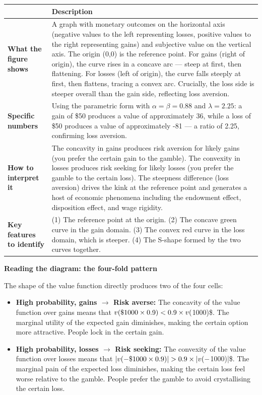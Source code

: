 \documentclass[12pt, letterpaper]{article}
\begin{document}
\begin{table}[H]
\centering
\small
\begin{tabularx}{\linewidth}{lY}
\toprule
 & Description \\
\midrule
\textbf{What the figure shows} & A graph with monetary outcomes on the horizontal axis (negative values to the left representing losses, positive values to the right representing gains) and subjective value on the vertical axis. The origin (0,0) is the reference point. For gains (right of origin), the curve rises in a concave arc --- steep at first, then flattening. For losses (left of origin), the curve falls steeply at first, then flattens, tracing a convex arc. Crucially, the loss side is steeper overall than the gain side, reflecting loss aversion. \\
\textbf{Specific numbers} & Using the parametric form with $\alpha = \beta = 0.88$ and $\lambda = 2.25$: a gain of \$50 produces a value of approximately 36, while a loss of \$50 produces a value of approximately -81 --- a ratio of 2.25, confirming loss aversion. \\
\textbf{How to interpret it} & The concavity in gains produces risk aversion for likely gains (you prefer the certain gain to the gamble). The convexity in losses produces risk seeking for likely losses (you prefer the gamble to the certain loss). The steepness difference (loss aversion) drives the kink at the reference point and generates a host of economic phenomena including the endowment effect, disposition effect, and wage rigidity. \\
\textbf{Key features to identify} & (1) The reference point at the origin. (2) The concave green curve in the gain domain. (3) The convex red curve in the loss domain, which is steeper. (4) The S-shape formed by the two curves together. \\
\bottomrule
\end{tabularx}
\end{table}


\textbf{Reading the diagram: the four-fold pattern}

The shape of the value function directly produces two of the four cells:
\begin{itemize}
\item \textbf{High probability, gains $\rightarrow$ Risk averse:} The concavity of the value function over gains means that $v(\$1000 \times 0.9) < 0.9 \times v(\\$1000)\$. The marginal utility of the expected gain diminishes, making the certain option more attractive. People lock in the certain gain.
\item \textbf{High probability, losses $\rightarrow$ Risk seeking:} The convexity of the value function over losses means that $|v(-\$1000 \times 0.9)| > 0.9 \times |v(-\\$1000)|\$. The marginal pain of the expected loss diminishes, making the certain loss feel worse relative to the gamble. People prefer the gamble to avoid crystallising the certain loss.
\end{itemize}
\end{document}
